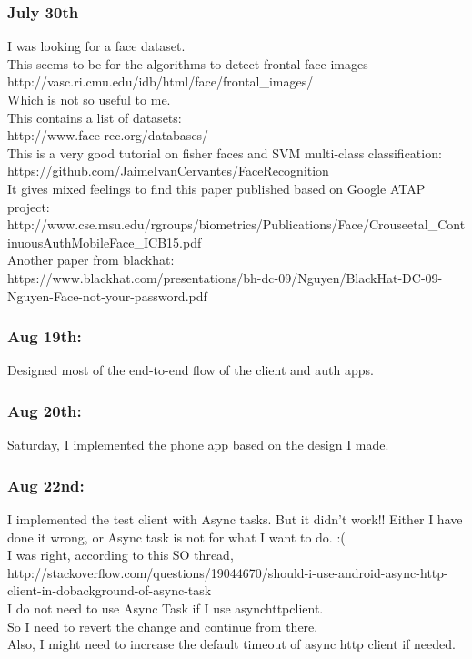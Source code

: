 \documentclass[11pt]{article}
\begin{document}
\subsubsection*{July 30th}
I was looking for a face dataset.\\
This seems to be for the algorithms to detect frontal face images - http://vasc.ri.cmu.edu/idb/html/face/frontal\_images/ \\
Which is not so useful to me.\\

This contains a list of datasets:\\
http://www.face-rec.org/databases/\\

This is a very good tutorial on fisher faces and SVM multi-class classification:\\
https://github.com/JaimeIvanCervantes/FaceRecognition\\

It gives mixed feelings to find this paper published based on Google ATAP project:\\
http://www.cse.msu.edu/rgroups/biometrics/Publications/Face/Crouseetal\_ContinuousAuthMobileFace\_ICB15.pdf\\

Another paper from blackhat:\\
https://www.blackhat.com/presentations/bh-dc-09/Nguyen/BlackHat-DC-09-Nguyen-Face-not-your-password.pdf\\

\subsubsection*{Aug 19th:}
Designed most of the end-to-end flow of the client and auth apps.

\subsubsection*{Aug 20th:}
Saturday, I implemented the phone app based on the design I made.

\subsubsection*{Aug 22nd:}
I implemented the test client with Async tasks. But it didn't work!! Either I have done it wrong, or Async task is not for what I want to do. :(\\
I was right, according to this SO thread, \\
http://stackoverflow.com/questions/19044670/should-i-use-android-async-http-client-in-dobackground-of-async-task\\
I do not need to use Async Task if I use asynchttpclient.\\
So I need to revert the change and continue from there.\\
Also, I might need to increase the default timeout of async http client if needed.\\
\end{document}
